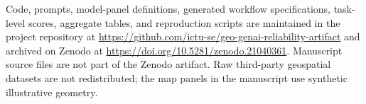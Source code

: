 \documentclass[12pt]{gsis}  %
\begin{document}
Code, prompts, model-panel definitions, generated workflow specifications, task-level scores, aggregate tables, and reproduction scripts are maintained in the project repository at \url{https://github.com/ictu-se/geo-genai-reliability-artifact} and archived on Zenodo at \url{https://doi.org/10.5281/zenodo.21040361}. Manuscript source files are not part of the Zenodo artifact. Raw third-party geospatial datasets are not redistributed; the map panels in the manuscript use synthetic illustrative geometry.



\end{document}
